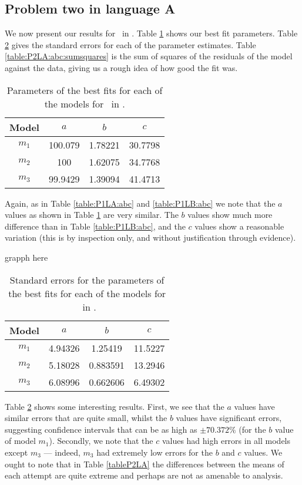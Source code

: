\subsection{Problem two in language A} \label{subsecP2LA}

We now present our results for \PO\ in \LB.
Table \ref{table:P2LA:abc} shows our best fit parameters.
Table \ref{table:P2LA:abc:error} gives the standard errors for each of the
parameter estimates.
Table \ref{table:P2LA:abc:sumsquares} is the sum of squares of the residuals of
the model against the data, giving us a rough idea of how good the fit was.

\begin{table}[ht!]
\centering
\begin{tabular}{|c|c|c|c|}
\hline
{\bf Model} &  $a$ & $b$ & $c$ \\
\hline
$m_1$ & 100.079 & 1.78221 & 30.7798 \\
\hline
$m_2$ & 100 & 1.62075 & 34.7768\\
\hline
$m_3$ & 99.9429 & 1.39094 & 41.4713 \\
\hline
\end{tabular}
\caption{Parameters of the best fits for each of the models for \PT\ in \LA.}
\label{table:P2LA:abc}
\end{table}

Again, as in Table \ref{table:P1LA:abc} and \ref{table:P1LB:abc} we note that
the $a$ values as shown in Table \ref{table:P2LA:abc} are very similar.
The $b$ values show much more difference than in Table \ref{table:P1LB:abc}, and
the $c$ values show a reasonable variation (this is by inspection only, and
without justification through evidence).

\FIXME grapph here

\begin{table}[ht!]
\centering
\begin{tabular}{|c|c|c|c|}
\hline
{\bf Model} &  $a$ & $b$ & $c$ \\
\hline
$m_1$ & 4.94326 & 1.25419 & 11.5227 \\
\hline
$m_2$ & 5.18028 & 0.883591 & 13.2946 \\
\hline
$m_3$ & 6.08996 & 0.662606 & 6.49302 \\
\hline
\end{tabular}
\caption{Standard errors for the parameters of the best fits for each of the models for \PT\ in \LA.}
\label{table:P2LA:abc:error}
\end{table}

Table \ref{table:P2LA:abc:error} shows some interesting results.
First, we see that the $a$ values have similar errors that are quite small,
whilst the $b$ values have significant errors, suggesting confidence intervals
that can be as high as $\pm 70.372\%$ (for the $b$ value of model $m_1$).
Secondly, we note that the $c$ values had high errors in all models except $m_3$
--- indeed, $m_3$ had extremely low errors for the $b$ and $c$ values.
We ought to note that in Table \ref{tableP2LA} the differences between the means
of each attempt are quite extreme and perhaps are not as amenable to analysis.

